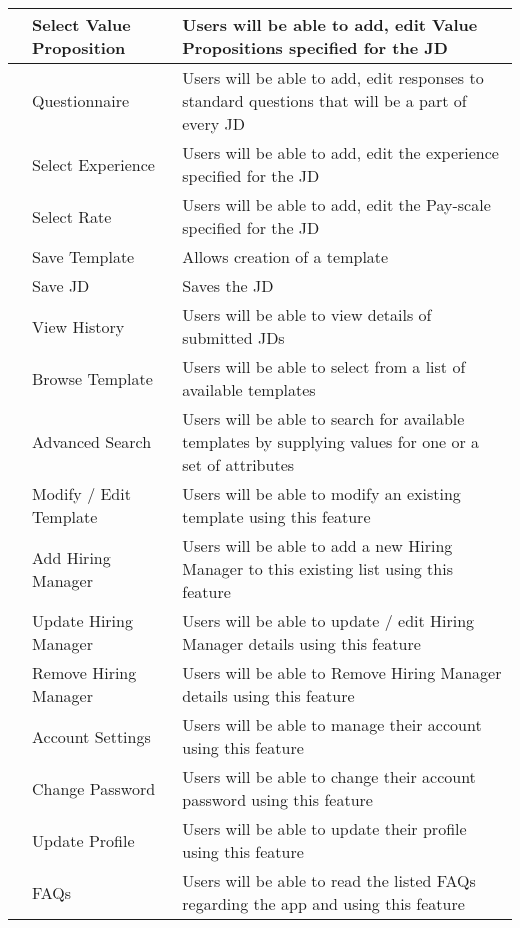 \documentclass[hidelinks,a4paper]{article}
\begin{document}
\begin{center}
{\begin{tabularx}{\textwidth}{ | >{\ttfamily\raggedright\arraybackslash} s 
	  | >{\ttfamily\raggedright\arraybackslash} t 
	  | >{\ttfamily\raggedright\arraybackslash} t | }
	 & Select Value Proposition & Users will be able to add, edit Value Propositions specified for the JD  \\
	 & Questionnaire & Users will be able to add, edit responses to standard questions that will be a part of every JD  \\
	 & Select Experience & Users will be able to add, edit the experience specified for the JD  \\
	 & Select Rate & Users will be able to add, edit the Pay-scale specified for the JD  \\
	 & Save Template & Allows creation of a template  \\ [1em]
	 & Save JD & Saves the JD  \\	[1em]
	 & View History & Users will be able to view details of submitted JDs  \\	
	 & Browse Template & Users will be able to select from a list of available templates   \\	
	 & Advanced Search & Users will be able to search for available templates by supplying values for one or a set of attributes   \\	
	 & Modify / Edit Template & Users will be able to modify an existing template using this feature  \\	
	 & Add Hiring Manager & Users will be able to add a new Hiring Manager to this existing list using this feature  \\	
	 & Update Hiring Manager & Users will be able to update / edit Hiring Manager details using this feature  \\	
	 & Remove Hiring Manager & Users will be able to Remove Hiring Manager details using this feature  \\	
	 & Account Settings & Users will be able to manage their account using this feature  \\	
	 & Change Password & Users will be able to change their account password using this feature  \\	
	 & Update Profile & Users will be able to update their profile using this feature  \\	
	 & FAQs & Users will be able to read the listed FAQs regarding the app and using this feature  \\	
	\hline							
	\end{tabularx}
	}
	\end{center}
					
\end{document}
